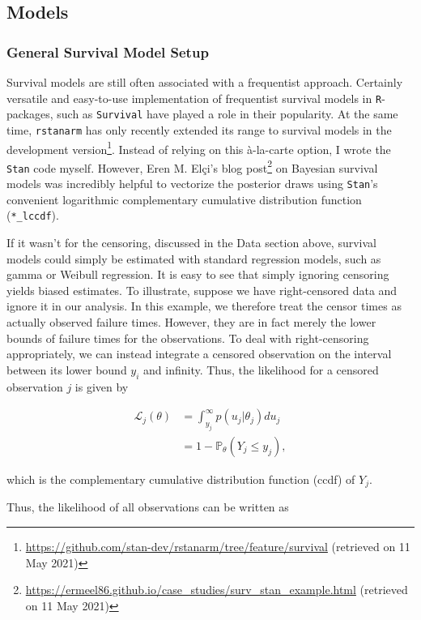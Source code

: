 \documentclass[11pt]{article}
\begin{document}
\subsection{Models}
\subsubsection{General Survival Model Setup}
Survival models are still often associated with a frequentist approach. Certainly versatile and easy-to-use implementation of frequentist survival models in \texttt{R}-packages, such as \texttt{Survival} \parencite{Rsurvival2020} have played a role in their popularity. At the same time, \texttt{rstanarm} \parencite{rstanarm2020} has only recently extended its range to survival models in the development version\footnote{\url{https://github.com/stan-dev/rstanarm/tree/feature/survival} (retrieved on 11 May 2021)}. Instead of relying on this à-la-carte option, I wrote the \texttt{Stan} code myself. However, Eren M. Elçi's blog post\footnote{\url{https://ermeel86.github.io/case_studies/surv_stan_example.html} (retrieved on 11 May 2021)} on Bayesian survival models was incredibly helpful to vectorize the posterior draws using \texttt{Stan}'s convenient logarithmic complementary cumulative distribution function (\texttt{*\_lccdf}).

If it wasn't for the censoring, discussed in the Data section above, survival models could simply be estimated with standard regression models, such as gamma or Weibull regression. It is easy to see that simply ignoring censoring yields biased estimates. To illustrate, suppose we have right-censored data and ignore it in our analysis. In this example, we therefore treat the censor times as actually observed failure times. However, they are in fact merely the lower bounds of failure times for the observations. To deal with right-censoring appropriately, we can instead integrate a censored observation on the interval between its lower bound $y_i$ and infinity. Thus, the likelihood for a censored observation $j$ is given by 

\begin{align*}
\mathcal{L}_j (\theta) &= \int_{y_j}^{\infty} p(u_j|\theta_j) du_j \\
&= 1-\mathbb{P}_\theta(Y_j \leq y_j),
\end{align*}

which is the complementary cumulative distribution function (ccdf) of $Y_j$.

Thus, the likelihood of all observations can be written as 
\end{document}
